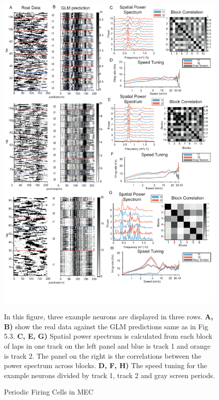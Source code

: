 \begin{figure}
    \centering
    \includegraphics[width=1\linewidth]{figures//Chapter 5 MEC/fig4_periodic_firing.pdf}
    \caption{Periodic Firing Cells in MEC}
    \label{fig:placeholder}
    \medskip
\small
In this figure, three example neurons are displayed in three rows. \textbf{A, B)} show the real data against the GLM predictions same as in Fig 5.3. \textbf{C, E, G)} Spatial power spectrum is calculated from each block of laps in one track on the left panel and blue is track 1 and orange is track 2. The panel on the right is the correlations between the power spectrum across blocks. \textbf{D, F, H)} The speed tuning for the example neurons divided by track 1, track 2 and gray screen periods.
\end{figure}
